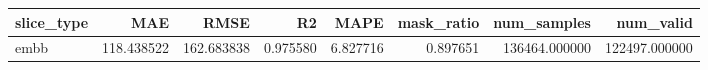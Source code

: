 \begin{tabular}{lrrrrrrr}
\toprule
slice_type & MAE & RMSE & R2 & MAPE & mask_ratio & num_samples & num_valid \\
\midrule
embb & 118.438522 & 162.683838 & 0.975580 & 6.827716 & 0.897651 & 136464.000000 & 122497.000000 \\
\bottomrule
\end{tabular}
